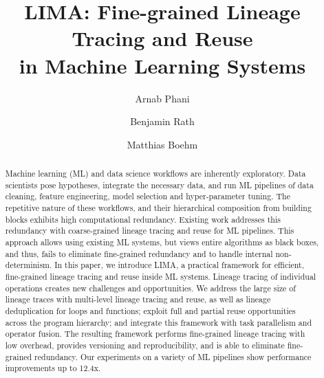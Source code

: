 \documentclass[sigconf,screen]{acmart}
\begin{document}
\fancyhead{} %




\title[LIMA: Lineage Tracing and Reuse in ML Systems]{LIMA: Fine-grained Lineage Tracing and Reuse\\ in Machine Learning Systems}

\author{Arnab Phani}

\author{Benjamin Rath}

\author{Matthias Boehm}

\renewcommand{\shortauthors}{Arnab Phani et al.}


\begin{abstract}
Machine learning (ML) and data science workflows are inherently exploratory. Data scientists pose hypotheses, integrate the necessary data, and run ML pipelines of data cleaning, feature engineering, model selection and hyper-parameter tuning. The repetitive nature of these workflows, and their hierarchical composition from building blocks exhibits high computational redundancy. 
Existing work addresses this redundancy with coarse-grained lineage tracing and reuse for ML pipelines. This approach allows using existing ML systems, but views entire algorithms as black boxes, and thus, fails to eliminate fine-grained redundancy and to handle internal non-determinism.
In this paper, we introduce LIMA, a practical framework for efficient, fine-grained lineage tracing and reuse inside ML systems. Lineage tracing of individual operations creates new challenges and opportunities. We address the large size of lineage traces with multi-level lineage tracing and reuse, as well as lineage deduplication for loops and functions; exploit full and partial reuse opportunities across the program hierarchy; and integrate this framework with task parallelism and operator fusion.
The resulting framework performs fine-grained lineage tracing with low overhead, provides versioning and reproducibility, and is able to eliminate fine-grained redundancy. Our experiments on a variety of ML pipelines show performance improvements up to 12.4x.
\end{abstract}
\end{document}
